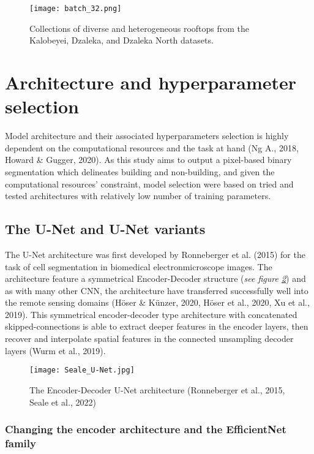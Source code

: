 \documentclass[11pt, a4paper, twoside]{report}
\begin{document}
\begin{figure}[H]
  \centering
  \texttt{[image: batch\_32.png]}
  \caption{Collections of diverse and heterogeneous rooftops from the Kalobeyei, Dzaleka, and Dzaleka North datasets.}
  \label{fig:rooftops}
\end{figure}

\section{Architecture and hyperparameter selection}\label{Arch&Hyperparam}

Model architecture and their associated hyperparameters selection is highly dependent on the computational resources and the task at hand (Ng A., 2018, Howard \& Gugger, 2020). As this study aims to output a pixel-based binary segmentation which delineates building and non-building, and given the computational resources' constraint, model selection were based on tried and tested architectures with relatively low number of training parameters.\\\par

\subsection{The U-Net and U-Net variants}\label{Unet}

The U-Net architecture was first developed by Ronneberger et al. (2015) for the task of cell segmentation in biomedical electronmicroscope images. The architecture feature a symmetrical Encoder-Decoder structure (\textit{see figure \ref{fig:U-Net}}) and as with many other CNN, the architecture have transferred successfully well into the remote sensing domains (Höser \& Künzer, 2020, Höser et al., 2020, Xu et al., 2019). This symmetrical encoder-decoder type architecture with concatenated skipped-connections is able to extract deeper features in the encoder layers, then recover and interpolate spatial features in the connected unsampling decoder layers (Wurm et al., 2019).\\\par

\begin{figure}[H]
  \centering
  \texttt{[image: Seale\_U-Net.jpg]}
  \caption{The Encoder-Decoder U-Net architecture (Ronneberger et al., 2015, Seale et al., 2022)}
  \label{fig:U-Net}
\end{figure}

\subsubsection{Changing the encoder architecture and the EfficientNet family}\label{EffNet}
\end{document}
